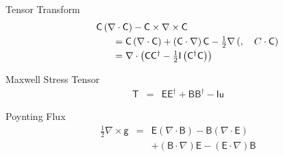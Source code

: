 \documentclass[aps,twocolumn,secnumarabic,nobalancelastpage,amsmath,amssymb,
amsthm,nofootinbib,parskip=full]{revtex4}
\numberwithin{equation}{section}
\newcommand{\qv}[1]{\mathbf{\mathsf{#1}}}
\begin{document}
Tensor Transform
\begin{equation*}
\begin{array}{rcl}
&&\qv{C}\left(\nabla\cdot\qv{C}\right)-\qv{C}\times\nabla\times\qv{C} \\[3pt]
&&\qquad
   =\qv{C}\left(\nabla\cdot\qv{C}\right)+\left(\qv{C}\cdot\nabla\right)\qv{C}
    -\frac{1}{2}\nabla\left(\qc{C}\cdot\qv{C}\right) \\[3pt]
&&\qquad
   =\nabla\cdot\left(
   \qv{C}\qv{C}^\dagger-\frac{1}{2}\qv{I}\left(\qv{C}^\dagger\qv{C}\right)\right)
\end{array}
\end{equation*}

Maxwell Stress Tensor
\begin{equation*}
\begin{array}{rcl}
  \qv{T}&=&\qv{E}\qv{E}^\dagger+\qv{B}\qv{B}^\dagger-\qv{I}\mathsf{u}
\end{array}
\end{equation*}

Poynting Flux
\begin{equation*}
\begin{array}{rcl}
\frac{1}{2}\nabla\times\mathsf{g}&=&
           \qv{E}\left(\nabla\cdot\qv{B}\right)
           -\qv{B}\left(\nabla\cdot\qv{E}\right) \\[3pt]
         &&+\left(\qv{B}\cdot\nabla\right)\qv{E}
           -\left(\qv{E}\cdot\nabla\right)\qv{B}
\end{array}
\end{equation*}
\end{document}
